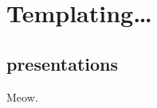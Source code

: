 \documentclass[aspectratio=169, 12pt]{beamer}
\begin{document}
\section{Templating\ldots}
\subsection{presentations}
\begin{frame}{\secname\subsecname}
    Meow.
\end{frame}
\end{document}
